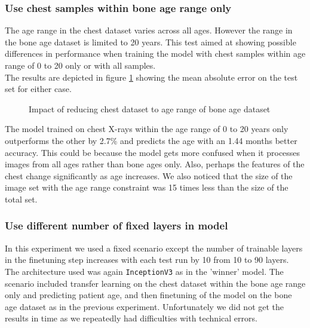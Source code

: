 \documentclass[10pt,twocolumn,letterpaper]{article}
\begin{document}
\subsubsection{Use chest samples within bone age range only}
The age range in the chest dataset varies across all ages. However the range in the bone age dataset is limited to 20 years. This test aimed at showing possible differences in performance when training the model with chest samples within age range of 0 to 20 only or with all samples.\\
The results are depicted in figure \ref{fig:maeagerange} showing the mean absolute error on the test set for either case.

\begin{figure}[H]
\centering
{}
\caption{Impact of reducing chest dataset to age range of bone age dataset}
\label{fig:maeagerange}
\end{figure}

The model trained on chest X-rays within the age range of 0 to 20 years only outperforms the other by 2.7\% and predicts the age with an 1.44 months better accuracy. This could be because the model gets more confused when it processes images from all ages rather than bone ages only. Also, perhaps the features of the chest change significantly as age increases. We also noticed that the size of the image set with the age range constraint was 15 times less than the size of the total set.

\subsubsection{Use different number of fixed layers in model}
In this experiment we used a fixed scenario except the number of trainable layers in the finetuning step increases with each test run by 10 from 10 to 90 layers. The architecture used was again \verb+InceptionV3+ as in the 'winner' model. The scenario included transfer learning on the chest dataset within the bone age range only and predicting patient age, and then finetuning of the model on the bone age dataset as in the previous experiment. Unfortunately we did not get the results in time as we repeatedly had difficulties with technical errors.
\end{document}
